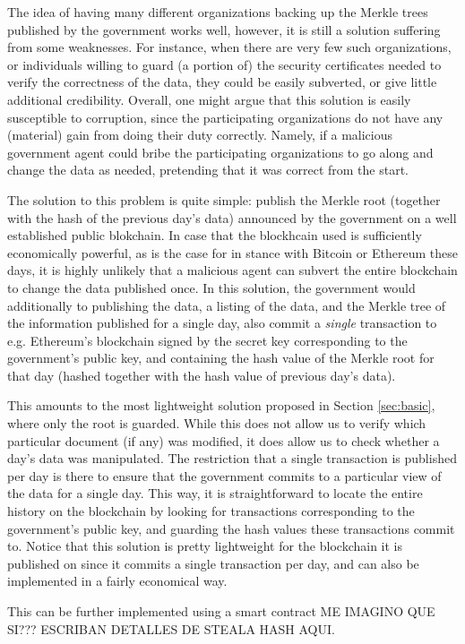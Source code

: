 The idea of having many different organizations backing up the Merkle trees published by the government works well, however, it is still a solution suffering from some weaknesses. For instance, when there are very few such organizations, or individuals willing to guard (a portion of) the security certificates needed to verify the correctness of the data, they could be easily subverted, or give little additional credibility. Overall, one might argue that this solution is easily susceptible to corruption, since the participating organizations do not have any (material) gain from doing their duty correctly. Namely, if a malicious government agent could bribe the participating organizations to go along and change the data as needed, pretending that it was correct from the start. %


The solution to this problem is quite simple: publish the Merkle root (together with the hash of the previous day's data) announced by the government on a well established public blokchain. In case that the blockhcain used is sufficiently economically powerful, as is the case for in stance with Bitcoin or Ethereum these days, it is highly unlikely that a malicious agent can subvert the entire blockchain to change the data published once. In this solution, the government would additionally to publishing the data, a listing of the data, and the Merkle tree of the information published for a single day, also commit a {\em single} transaction to e.g. Ethereum's blockchain signed by the secret key corresponding to the government's public key, and containing the hash value of the Merkle root for that day (hashed together with the hash value of previous day's data).

This amounts to the most lightweight solution proposed in Section \ref{sec:basic}, where only the root is guarded. While this does not allow us to verify which particular document (if any) was modified, it does allow us to check whether a day's data was manipulated. The restriction that a single transaction is published per day is there to ensure that  the government commits to a particular view of the data for a single day. This way, it is straightforward to locate the entire history on the blockchain by looking for transactions corresponding to the government's public key, and guarding the hash values these transactions commit to. Notice that this solution is pretty lightweight for the blockchain it is published on since it commits a single transaction per day, and can also be implemented in a fairly economical way.

This can be further implemented using a smart contract ME IMAGINO QUE SI??? ESCRIBAN DETALLES DE STEALA HASH AQUI.